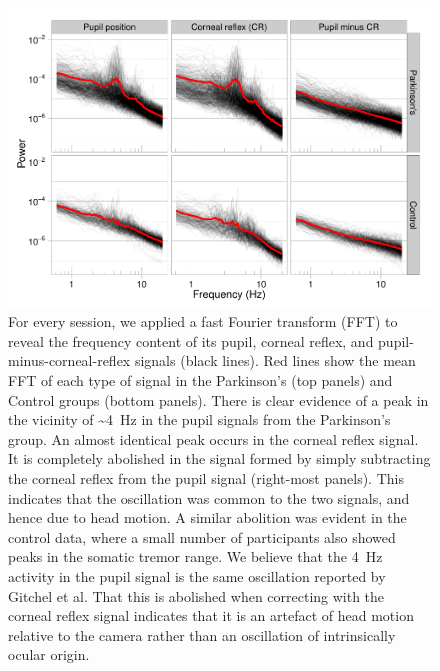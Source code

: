 \documentclass[jou,a4paper]{apa6}
\begin{document}
\begin{figure}[htbp]
\begin{center}
\includegraphics {Figures/Figure_3_Individual_FFTs}
\caption{For every session, we applied a fast Fourier transform (FFT) to reveal the frequency content of its pupil, corneal reflex, and pupil-minus-corneal-reflex signals (black lines). Red lines show the mean FFT of each type of signal in the Parkinson's (top panels) and Control groups (bottom panels). There is clear evidence of a peak in the vicinity of \textasciitilde4~Hz in the pupil signals from the Parkinson's group. An almost identical peak occurs in the corneal reflex signal. It is completely abolished in the signal formed by simply subtracting the corneal reflex from the pupil signal (right-most panels). This indicates that the oscillation was common to the two signals, and hence due to head motion. A similar abolition was evident in the control data, where a small number of participants also showed peaks in the somatic tremor range. We believe that the 4~Hz activity in the pupil signal is the same oscillation reported by Gitchel et al. That this is abolished when correcting with the corneal reflex signal indicates that it is an artefact of head motion relative to the camera rather than an oscillation of intrinsically ocular origin.}
\label{fig:FFT}
\end{center}
\end{figure}
\end{document}

